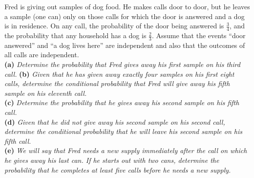 \begin{exercise}
    Fred is giving out samples of dog food. He makes calls door to door, but he leaves a sample (one can) only on those calls for which the door is answered and a dog is in residence. On any call, the probability of the door being answered is \(\frac{3}{4}\), and the probability that any household has a dog is \(\frac{2}{3}\). Assume that the events “door answered” and “a dog lives here” are independent and also that the outcomes of all calls are independent. \\

    \textbf{(a)} \textit{Determine the probability that Fred gives away his first sample on his third call.}
    \textbf{(b)} \textit{Given that he has given away exactly four samples on his first eight calls, determine the conditional probability that Fred will give away his fifth sample on his eleventh call.}\\
    \textbf{(c)} \textit{Determine the probability that he gives away his second sample on his fifth call.}\\
    \textbf{(d)} \textit{Given that he did not give away his second sample on his second call, determine the conditional probability that he will leave his second sample on his fifth call.}\\
    \textbf{(e)} \textit{We will say that Fred needs a new supply immediately after the call on which he gives away his last can. If he starts out with two cans, determine the probability that he completes at least five calls before he needs a new supply.}\\
\end{exercise}

